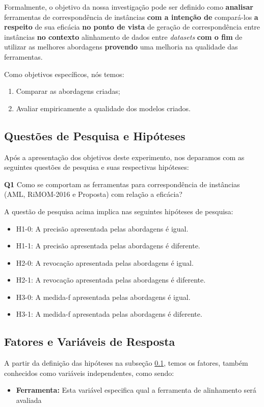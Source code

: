Formalmente, o objetivo da nossa investigação pode ser definido como \textbf{analisar} ferramentas de correspondência de instâncias \textbf{com a intenção de}  compará-los \textbf{a respeito} de sua eficácia \textbf{no ponto de vista} de geração de correspondência entre instâncias \textbf{no contexto} alinhamento de dados entre \textit{datasets} \textbf{com o fim} de utilizar as melhores abordagens \textbf{provendo} uma melhoria na qualidade das ferramentas.

Como objetivos específicos, nós temos:
\begin{enumerate}[label=\roman*]
\item Comparar as abordagens criadas;
\item Avaliar empiricamente a qualidade dos modelos criados.
\end{enumerate}


\subsection{Questões de Pesquisa e Hipóteses}
\label{sub:hipoteses}
Após a apresentação dos objetivos deste experimento, nos deparamos com as seguintes questões de pesquisa e suas respectivas hipóteses:

\textbf{Q1} Como se comportam as ferramentas para correspondência de instâncias (AML, RiMOM-2016 e Proposta) com relação a eficácia? 

A questão de pesquisa acima implica nas seguintes hipóteses de pesquisa:

\begin{itemize}
\item H1-0: A precisão apresentada pelas abordagens é igual.
\item H1-1: A precisão apresentada pelas abordagens é diferente.
\item H2-0: A revocação apresentada pelas abordagens é igual.
\item H2-1: A revocação apresentada pelas abordagens é diferente.
\item H3-0: A medida-f apresentada pelas abordagens é igual.
\item H3-1: A medida-f apresentada pelas abordagens é diferente.
\end{itemize}

\subsection{Fatores e Variáveis de Resposta}
A partir da definição das hipóteses na subseção \ref{sub:hipoteses}, temos os fatores, também conhecidos como variáveis independentes, como sendo:
\begin{itemize}
	\item \textbf{Ferramenta:} Esta variável especifica qual a ferramenta de alinhamento será avaliada
\end{itemize}

